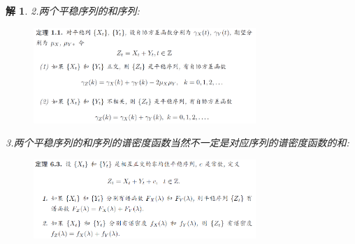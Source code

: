 \documentclass[11pt,a4paper]{ctexart}
\newtheorem*{solution}{解}
\begin{document}
\begin{enumerate}
\begin{solution}
	2.两个平稳序列的和序列:
	\begin{figure}[H]
		\centering
		\includegraphics[width=0.75\textwidth]{1.png}  
	\end{figure}

3.两个平稳序列的和序列的谱密度函数当然不一定是对应序列的谱密度函数的和:
\begin{figure}[H]
	\centering
	\includegraphics[width=0.75\textwidth]{6.png}  
\end{figure}
\end{solution}

\end{enumerate}
\end{document}
